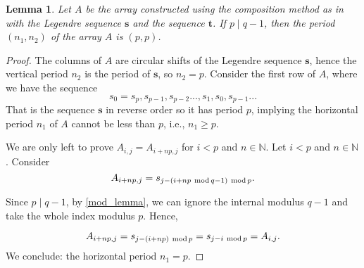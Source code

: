 \documentclass[12pt]{article}
\renewcommand{\mod}{\ \textup{mod}\,}
\newtheorem{lemma}[theorem]{Lemma}
\theoremstyle{definition}
\theoremstyle{definition}
\theoremstyle{definition}
\theoremstyle{plain}
\theoremstyle{plain}
\numberwithin{equation}{section}
\begin{document}
\begin{lemma}\label{lemma2}
Let $A$ be the array constructed using the composition method as in  with the Legendre sequence $\mathbf{s}$ and the sequence $\mathbf{t}$. 
If $p \mid q-1$, then the period $(n_1,n_2)$ of the array $A$ is $(p,p)$.
\end{lemma}
\begin{proof}
    The columns of $A$ are circular shifts of the Legendre sequence $\mathbf{s}$, hence the vertical period $n_2$ is the period of $\mathbf{s}$, so $n_2 = p$. 
    Consider the first row of $A$, where we have the sequence
    \[
        s_0 = s_p, s_{p-1}, s_{p-2} ..., s_{1}, s_{0}, s_{p-1}... 
    \]
    That is the sequence $\mathbf{s}$ in reverse order so it has period $p$, implying the horizontal period $n_1$ of $A$ cannot be less than $p$, i.e., $n_1 \geqslant p$.
    
    We are only left to prove $A_{i,j} = A_{i+np,j}$ for $i<p$ and $n\in\mathbb{N}$. 
    Let $i<p$ and $n \in \mathbb{N}$. 
    Consider
    \[
        A_{i+np,j} = s_{j- (i + np \mod q-1) \mod p}.
    \]
    
    Since $p \mid q-1$, by \cref{mod_lemma}, we can ignore the internal modulus $q-1$ and take the whole index modulus $p$.
    Hence, 
    
    \[
         A_{i+np,j} = s_{j-(i+np) \mod p} = s_{j-i \mod p} = A_{i,j}.
    \]
    We conclude: the horizontal period $n_1 = p$. 
\end{proof}
\end{document}
